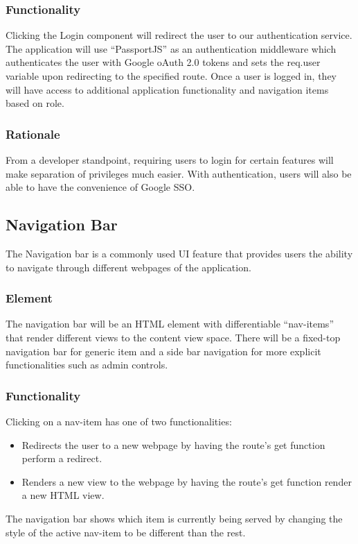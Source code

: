 \documentclass[journal,10pt,onecolumn,compsoc]{IEEEtran}
\begin{document}
			\subsubsection{Functionality}
				Clicking the Login component will redirect the user to our authentication service. 
				The application will use ``PassportJS'' as an authentication middleware which authenticates the user with Google oAuth 2.0 tokens and sets the req.user variable upon redirecting to the specified route. 
				Once a user is logged in, they will have access to additional application functionality and navigation items based on role.
			\subsubsection{Rationale}
				From a developer standpoint, requiring users to login for certain features will make separation of privileges much easier. With authentication, users will also be able to have the convenience of Google SSO.
	
		\subsection{Navigation Bar}
			The Navigation bar is a commonly used UI feature that provides users the ability to navigate through different webpages of the application.
			\subsubsection{Element}
				The navigation bar will be an HTML element with differentiable ``nav-items'' that render different views to the content view space. There will be a fixed-top navigation bar for generic item and a side bar navigation for more explicit functionalities such as admin controls. 
			\subsubsection{Functionality}
				Clicking on a nav-item has one of two functionalities: 
				\begin{itemize}
					\item Redirects the user to a new webpage by having the route's get function perform a redirect.
					\item Renders a new view to the webpage by having the route's get function render a new HTML view.
				\end{itemize}
				The navigation bar shows which item is currently being served by changing the style of the active nav-item to be different than the rest.
\end{document}
